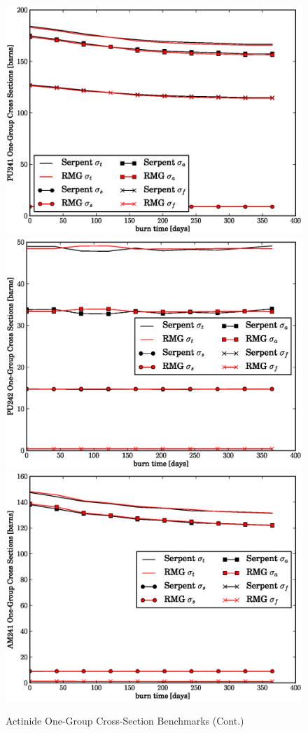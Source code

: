 \begin{figure}[htbp]
\caption{Actinide One-Group Cross-Section Benchmarks (Cont.)}
\label{act_xs_benchmark_cont}
\begin{center}
\includegraphics[scale=0.3]{multigroup_method/figs/benchmark/PU241_1g_xs.eps}
\includegraphics[scale=0.3]{multigroup_method/figs/benchmark/PU242_1g_xs.eps}
\includegraphics[scale=0.3]{multigroup_method/figs/benchmark/AM241_1g_xs.eps}

\end{center}
\end{figure}
